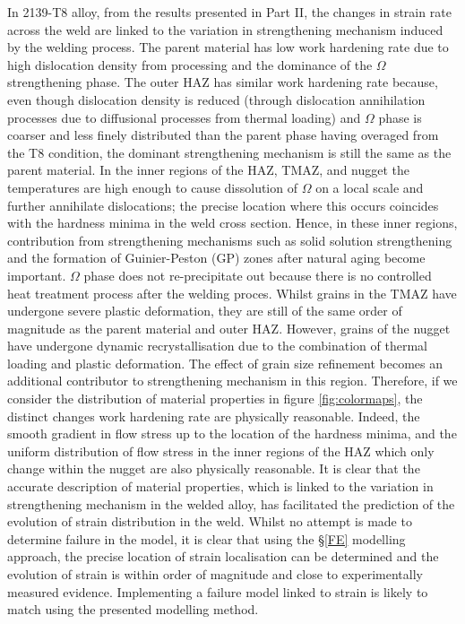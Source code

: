 In 2139-T8 alloy, from the results presented in Part II, the changes in strain rate across the weld are linked to the variation in strengthening mechanism induced by the welding process. The parent material has low work hardening rate due to high dislocation density from processing and the dominance of the $\Omega$ strengthening phase. The outer HAZ has similar work hardening rate because, even though dislocation density is reduced (through dislocation annihilation processes due to diffusional processes from thermal loading) and $\Omega$ phase is coarser and less finely distributed than the parent phase having overaged from the T8 condition, the dominant strengthening mechanism is still the same as the parent material. In the inner regions of the HAZ, TMAZ, and nugget the temperatures are high enough to cause dissolution of $\Omega$ on a local scale and further annihilate dislocations; the precise location where this occurs coincides with the hardness minima in the weld cross section. Hence, in these inner regions, contribution from strengthening mechanisms such as solid solution strengthening and the formation of Guinier-Peston (GP) zones after natural aging become important. $\Omega$ phase does not re-precipitate out because there is no controlled heat treatment process after the welding proces. Whilst grains in the TMAZ have undergone severe plastic deformation, they are still of the same order of magnitude as the parent material and outer HAZ. However, grains of the nugget have undergone dynamic recrystallisation due to the combination of thermal loading and plastic deformation. The effect of grain size refinement becomes an additional contributor to strengthening mechanism in this region. Therefore, if we consider the distribution of material properties in figure \ref{fig:colormaps}, the distinct changes work hardening rate are physically reasonable. Indeed, the smooth gradient in flow stress up to the location of the hardness minima, and the uniform distribution of flow stress in the inner regions of the HAZ which only change within the nugget are also physically reasonable. 
It is clear that the accurate description of material properties, which is linked to the variation in strengthening mechanism in the welded alloy, has facilitated the prediction of the evolution of strain distribution in the weld. Whilst no attempt is made to determine failure in the model, it is clear that using the \S\ref{FE} modelling approach, the precise location of strain localisation can be determined and the evolution of strain is within order of magnitude and close to experimentally measured evidence. Implementing a failure model linked to strain is likely to match using the presented modelling method.
